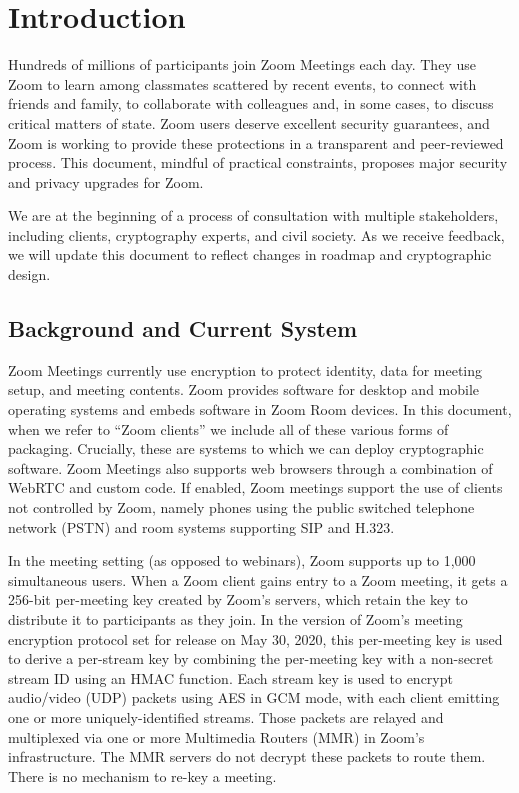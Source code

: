 \section{Introduction}
Hundreds of millions of participants join Zoom Meetings each day. They use Zoom to learn among classmates scattered by recent events, to connect with friends and family, to collaborate with colleagues and, in some cases, to discuss critical matters of state. Zoom users deserve excellent security guarantees, and Zoom is working to provide these protections in a transparent and peer-reviewed process. This document, mindful of practical constraints, proposes major security and privacy upgrades for Zoom.

We are at the beginning of a process of consultation with multiple stakeholders, including clients, cryptography experts, and civil society. As we receive feedback, we will update this document to reflect changes in roadmap and cryptographic design.

\subsection{Background and Current System}
Zoom Meetings currently use encryption to protect identity, data for meeting setup, and meeting contents. Zoom provides software for desktop and mobile operating systems and embeds software in Zoom Room devices. In this document, when we refer to ``Zoom clients'' we include all of these various forms of packaging. Crucially, these are systems to which we can deploy cryptographic software. Zoom Meetings also supports web browsers through a combination of WebRTC and custom code. If enabled, Zoom meetings support the use of clients not controlled by Zoom, namely phones using the public switched telephone network (PSTN) and room systems supporting SIP and H.323.

In the meeting setting (as opposed to webinars), Zoom supports up to 1,000 simultaneous users. When a Zoom client gains entry to a Zoom meeting, it gets a 256-bit per-meeting key created by Zoom's servers, which retain the key to distribute it to participants as they join. In the version of Zoom's meeting encryption protocol set for release on May 30, 2020, this per-meeting key is used to derive a per-stream key by combining the per-meeting key with a non-secret stream ID using an HMAC function. Each stream key is used to encrypt audio/video (UDP) packets using AES in GCM mode, with each client emitting one or more uniquely-identified streams. Those packets are relayed and multiplexed via one or more Multimedia Routers (MMR) in Zoom's infrastructure. The MMR servers do not decrypt these packets to route them. There is no mechanism to re-key a meeting.

